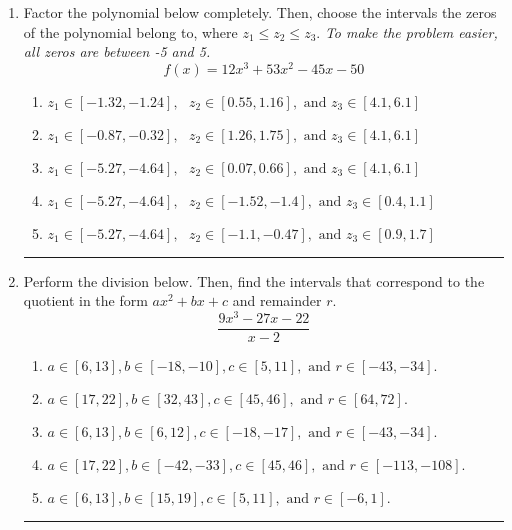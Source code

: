 \documentclass[14pt]{extbook}
\newcommand{\litem}[1]{\item#1\hspace*{-1cm}\rule{\textwidth}{0.4pt}}
\begin{document}
\begin{enumerate}
{\begin{enumerate}[label=\Alph*.]
\end{enumerate} }
\litem{
Factor the polynomial below completely. Then, choose the intervals the zeros of the polynomial belong to, where $z_1 \leq z_2 \leq z_3$. \textit{To make the problem easier, all zeros are between -5 and 5.}\[ f(x) = 12x^{3} +53 x^{2} -45 x -50 \]\begin{enumerate}[label=\Alph*.]
\item \( z_1 \in [-1.32, -1.24], \text{   }  z_2 \in [0.55, 1.16], \text{   and   } z_3 \in [4.1, 6.1] \)
\item \( z_1 \in [-0.87, -0.32], \text{   }  z_2 \in [1.26, 1.75], \text{   and   } z_3 \in [4.1, 6.1] \)
\item \( z_1 \in [-5.27, -4.64], \text{   }  z_2 \in [0.07, 0.66], \text{   and   } z_3 \in [4.1, 6.1] \)
\item \( z_1 \in [-5.27, -4.64], \text{   }  z_2 \in [-1.52, -1.4], \text{   and   } z_3 \in [0.4, 1.1] \)
\item \( z_1 \in [-5.27, -4.64], \text{   }  z_2 \in [-1.1, -0.47], \text{   and   } z_3 \in [0.9, 1.7] \)

\end{enumerate} }
\litem{
Perform the division below. Then, find the intervals that correspond to the quotient in the form $ax^2+bx+c$ and remainder $r$.\[ \frac{9x^{3} -27 x -22}{x -2} \]\begin{enumerate}[label=\Alph*.]
\item \( a \in [6, 13], b \in [-18, -10], c \in [5, 11], \text{ and } r \in [-43, -34]. \)
\item \( a \in [17, 22], b \in [32, 43], c \in [45, 46], \text{ and } r \in [64, 72]. \)
\item \( a \in [6, 13], b \in [6, 12], c \in [-18, -17], \text{ and } r \in [-43, -34]. \)
\item \( a \in [17, 22], b \in [-42, -33], c \in [45, 46], \text{ and } r \in [-113, -108]. \)
\item \( a \in [6, 13], b \in [15, 19], c \in [5, 11], \text{ and } r \in [-6, 1]. \)


\end{enumerate}}
\end{enumerate}
\end{document}
